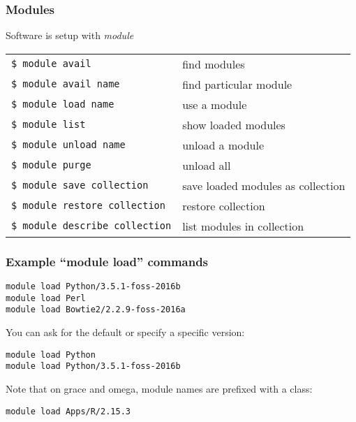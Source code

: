 \documentclass[10pt]{beamer}
\begin{document}
\begin{frame}[fragile]
\frametitle{Modules}

Software is setup with \it{module}

\begin{tabular}{|l|l|}
\hline
\verb+$ module avail + & find modules \\
\verb+$ module avail name+ & find particular module \\
\verb+$ module load name+ & use a module \\
\verb+$ module list+ & show loaded modules \\
\verb+$ module unload name+ & unload a module \\ 
\verb+$ module purge+ & unload all \\
\verb+$ module save collection + & save loaded modules as collection \\
\verb+$ module restore collection+ & restore collection \\
\verb+$ module describe collection+ & list modules in collection \\
\hline
\end{tabular}

\end{frame}

\begin{frame}[fragile]
\frametitle{Example ``module load'' commands}

\begin{verbatim}
module load Python/3.5.1-foss-2016b
module load Perl
module load Bowtie2/2.2.9-foss-2016a
\end{verbatim}

You can ask for the default or specify a specific version:
\begin{verbatim}
module load Python
module load Python/3.5.1-foss-2016b
\end{verbatim}

Note that on grace and omega, module names are prefixed with a class: 
\begin{verbatim}
module load Apps/R/2.15.3
\end{verbatim}
 
\end{frame}
\end{document}
